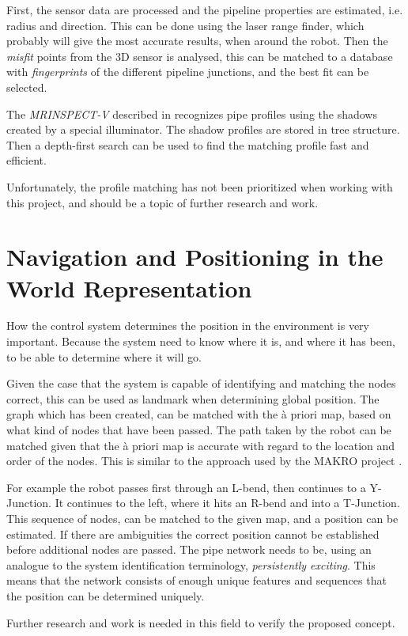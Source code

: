First, the sensor data are processed and the pipeline properties are estimated, i.e.
radius and direction. This can be done using the laser range finder, which probably will
give the most accurate results, when around the robot. Then the \emph{misfit} points from
the 3D sensor is analysed, this can be matched to a database with \emph{fingerprints} of
the different pipeline junctions, and the best fit can be selected. \cite{sintef-tof}

The \emph{MRINSPECT-V} described in \cite{MRINSPECT-V} recognizes pipe profiles using the 
shadows created by a special illuminator. The shadow profiles are stored in tree
structure. Then a depth-first search can be used to find the matching profile fast and
efficient. 


Unfortunately, the profile matching has not been prioritized when working with this
project, and should be a topic of further research and work. 


\section{Navigation and Positioning in the World Representation}
How the control system determines the position in the environment is very important.
Because the system need to know where it is, and where it has been, to be
able to determine where it will go. 

Given the case that the system is capable of identifying and matching
the nodes correct, this can be used as landmark when determining global position. The
graph which has been created, can be matched with the \`a priori map, based on what kind
of nodes that have been passed. The path taken by the robot can be matched given that the
\`a priori map is accurate with regard to the location and order of the nodes. This is
similar to the approach used by the MAKRO project \cite{makro-visual}.

For example the robot passes first through an L-bend, then continues to a Y-Junction. It
continues to the left, where it hits an R-bend and into a T-Junction. This sequence of
nodes, can be matched to the given map, and a position can be estimated. If there are
ambiguities the correct position cannot be established before additional nodes are passed.
The pipe network needs to be, using an analogue to the system identification terminology, 
\emph{persistently exciting}. This means that the network consists of enough unique features and
sequences that the position can be determined uniquely. 

Further research and work is needed in this field to verify the proposed concept. 


